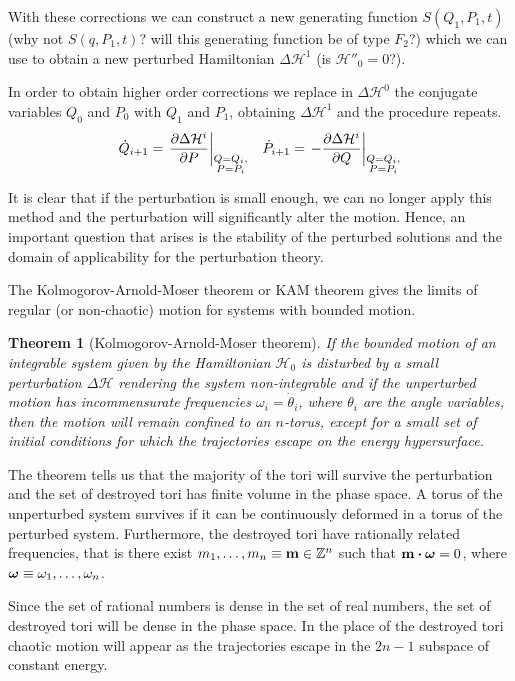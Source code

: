 \documentclass[../thesis.tex]{subfiles}
\theoremstyle{plain}
\newtheorem*{theorem*}{Theorem}
\begin{document}
{\color{red}With these corrections we can construct a new generating function
\(S(Q_1,P_1,t)\) (why not \(S(q,P_1,t)\)?
will this generating function be of type \(F_2\)?) which we can use to obtain
a new perturbed Hamiltonian \(\Delta \mathcal{H}^1\) (is \(\mathcal{H''}_0 = 0\)?)}.

In order to obtain higher order corrections we replace in \(\Delta \mathcal{H}^0\)
the conjugate variables \(Q_0\) and \(P_0\) with \(Q_1\) and \(P_1\),
obtaining \(\Delta \mathcal{H}^1\) and the procedure repeats.
\begin{align*}
  \dot{Q}_{i+1} = \eval{\pdv{\Delta \mathcal{H}^i}{P}}_{\substack{Q=Q_i,\\P=P_i}} &&
  \dot{P}_{i+1} = \eval{-\pdv{\Delta \mathcal{H}^i}{Q}}_{\substack{Q=Q_i,\\P=P_i}}
\end{align*}

It is clear that if the perturbation is small enough, we can no longer apply
this method and the perturbation will significantly alter the motion.
Hence, an important question that arises is the stability of the perturbed solutions
and the domain of applicability for the perturbation theory.

The Kolmogorov-Arnold-Moser theorem or KAM theorem gives the limits of regular (or
non-chaotic) motion for systems with bounded motion.


\begin{theorem*}[Kolmogorov-Arnold-Moser theorem]
  If the bounded motion of an integrable system given by the Hamiltonian \(\mathcal{H}_0\)
  is disturbed by a small perturbation \(\Delta \mathcal{H}\) rendering the system
  non-integrable and if the unperturbed motion has {\color{red}incommensurate}
  frequencies \(\omega_i=\dot{\theta}_i\), where \(\theta_i\) are the angle
  variables, then the motion will remain confined to an \(n\)-torus, except for
  a small set of initial conditions for which the trajectories escape on the
  energy hypersurface.
\end{theorem*}

The theorem tells us that the majority of the tori will survive the perturbation
and the set of destroyed tori has finite volume in the phase space.
A torus of the unperturbed system survives if it can be continuously deformed
in a torus of the perturbed system.
Furthermore, the destroyed tori have rationally related frequencies, that is
there exist \(m_1,\dotsc,m_n \equiv \vb{m} \in \mathbb{Z}^n\) such that
\(\vb{m} \vdot \vb*{\omega} = 0\), where \(\vb*{\omega} \equiv \omega_1,\dotsc,\omega_n\).

Since the set of rational numbers is {\color{red}dense} in the set of real numbers,
the set of destroyed tori will be {\color{red}dense in the phase space}. In the
place of the destroyed tori chaotic motion will appear as the trajectories escape
in the \(2n-1\) subspace of constant energy.
\end{document}
